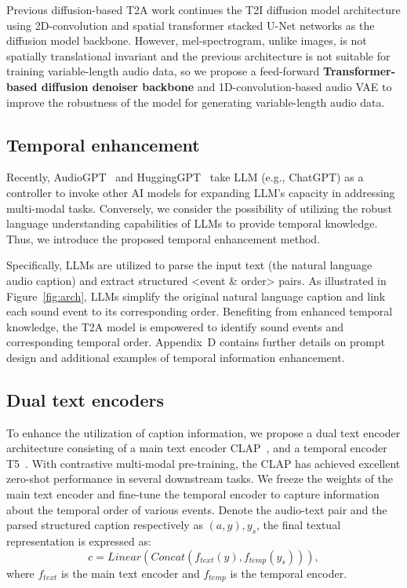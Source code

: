 \documentclass{article}
\begin{document}
Previous diffusion-based T2A work continues the T2I diffusion model architecture using 2D-convolution and spatial transformer stacked U-Net networks as the diffusion model backbone. However, mel-spectrogram, unlike images, is not spatially translational invariant and the previous architecture is not suitable for training variable-length audio data, so we propose a feed-forward \textbf{Transformer-based diffusion denoiser backbone} and 1D-convolution-based audio VAE to improve the robustness of the model for generating variable-length audio data.

\subsection{Temporal enhancement}
Recently, AudioGPT~\cite{huang2023audiogpt} and HuggingGPT~\cite{shen2023hugginggpt} take LLM (e.g., ChatGPT) as a controller to invoke other AI models for expanding LLM's capacity in addressing multi-modal tasks. Conversely, we consider the possibility of utilizing the robust language understanding capabilities of LLMs to provide temporal knowledge. Thus, we introduce the proposed temporal enhancement method.

Specifically, LLMs are utilized to parse the input text (the natural language audio caption) and extract structured <event \& order> pairs. As illustrated in Figure~\ref{fig:arch}, LLMs simplify the original natural language caption and link each sound event to its corresponding order. Benefiting from enhanced temporal knowledge, the T2A model is empowered to identify sound events and corresponding temporal order. Appendix~D contains further details on prompt design and additional examples of temporal information enhancement.

\subsection{Dual text encoders}
To enhance the utilization of caption information, we propose a dual text encoder architecture consisting of a main text encoder CLAP~\cite{elizalde2022clap}, and a temporal encoder T5~\cite{raffel2020exploring}. With contrastive multi-modal pre-training, the CLAP has achieved excellent zero-shot performance in several downstream tasks. We freeze the weights of the main text encoder and fine-tune the temporal encoder to capture information about the temporal order of various events. 
Denote the audio-text pair and the parsed structured caption respectively as $(a,y), y_s$, the final textual representation is expressed as:
\begin{equation}
    c=Linear(Concat(f_{text}(y),f_{temp}(y_s))),
\end{equation}
where $f_{text}$ is the main text encoder and $f_{temp}$ is the temporal encoder.
\end{document}
